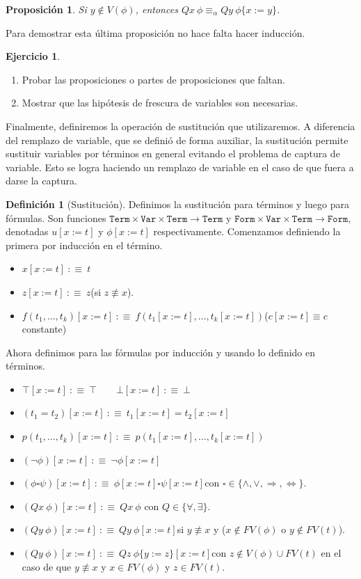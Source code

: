 \documentclass[a4paper, 12pt]{report}
\newcommand{\Ra}{\Rightarrow}
\newcommand{\Lra}{\Leftrightarrow}
\newtheorem{prop}[teorema]{Proposición}
\theoremstyle{definition}
\newtheorem{definicion}[teorema]{Definición}
\newtheorem{ejercicio}{Ejercicio}[section]
\begin{document}
\begin{prop}\label{prop-alphaEquivCV}
	Si $y\not\in V(\phi)$, entonces $Qx~\phi\equiv_\alpha Qy~\phi\{x:=y\}$.
\end{prop}
Para demostrar esta última proposición no hace falta hacer inducción.

\begin{ejercicio}
	\begin{enumerate}
		\item Probar las proposiciones o partes de proposiciones que faltan.
		\item Mostrar que las hipótesis de frescura de variables son necesarias.
	\end{enumerate}
	
\end{ejercicio}

Finalmente, definiremos la operación de sustitución que utilizaremos. A diferencia del remplazo de variable, que se definió de forma auxiliar, la sustitución permite sustituir variables por términos en general evitando el problema de captura de variable. Esto se logra haciendo un remplazo de variable en el caso de que fuera a darse la captura.

\begin{definicion}[Sustitución]
	Definimos la sustitución para términos y luego para fórmulas. Son funciones $\mathtt{Term}\times\mathtt{Var}\times\mathtt{Term}\to\mathtt{Term}$ y $\mathtt{Form}\times\mathtt{Var}\times\mathtt{Term}\to\mathtt{Form}$, denotadas $u[x:=t]$ y $\phi[x:=t]$ respectivamente. Comenzamos definiendo la primera por inducción en el término.
	\begin{itemize}
		\item $x[x:=t] ~:\equiv~ t$
		\item $z[x:=t] ~:\equiv~ z$\quad(si $z\not\equiv x$).
		\item $f(t_1,\dots,t_k)[x:=t]~:\equiv~f(t_1[x:=t],\dots,t_k[x:=t])$\quad ($c[x:=t]\equiv c$ constante)
	\end{itemize}
	Ahora definimos para las fórmulas por inducción y usando lo definido en términos.
	\begin{itemize}
		\item $\top[x:=t]~:\equiv~\top\qquad \bot[x:=t]~:\equiv~\bot$
		\item $(t_1=t_2)[x:=t]~:\equiv~ t_1[x:=t]=t_2[x:=t]$
		\item $p(t_1,\dots,t_k)[x:=t]~:\equiv~p(t_1[x:=t],\dots,t_k[x:=t])$
		\item $(\lnot\phi)[x:=t]~:\equiv~\lnot\phi[x:=t]$
		\item $(\phi\square\psi)[x:=t]~:\equiv~\phi[x:=t]\square\psi[x:=t]$\quad con $\square\in\{\wedge,\vee,\Ra,\Lra\}$.
		\item $(Qx~\phi)[x:=t]~:\equiv~Qx~\phi$ \quad con $Q\in\{\forall,\exists\}$.
		\item $(Qy~\phi)[x:=t]~:\equiv~Qy~\phi[x:=t]$\quad si $y\not\equiv x$ y ($x\not\in FV(\phi)$ o $y\not\in FV(t)$).
		\item $(Qy~\phi)[x:=t]~:\equiv~Qz~\phi\{y:=z\}[x:=t]$\quad con $z\not\in V(\phi)\cup FV(t)$ \quad en el caso de que $y\not\equiv x$ y $x\in FV(\phi)$ y $z\in FV(t)$.
	\end{itemize}
\end{definicion}
\end{document}
